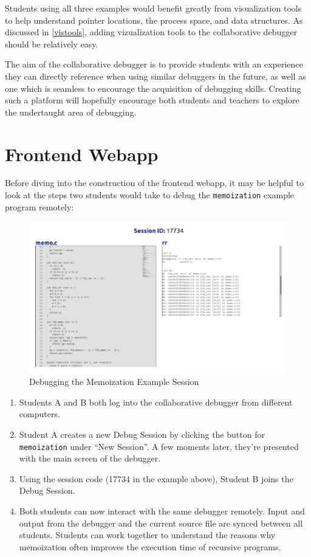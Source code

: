 \documentclass[12pt]{article}
\begin{document}
Students using all three examples would benefit greatly from
visualization tools to help understand pointer locations, the process
space, and data structures.  As discussed in \ref{vistools}, adding
vizualization tools to the collaborative debugger should be relatively
easy.
\par 

The aim of the collaborative debugger is to provide students with an
experience they can directly reference when using similar debuggers in
the future, as well as one which is seamless to encourage the
acquisition of debugging skills.  Creating such a platform will
hopefully encourage both students and teachers to explore the
undertaught area of debugging.

\section{Frontend Webapp}\label{webapp}

Before diving into the construction of the frontend webapp, it may be
helpful to look at the steps two students would take to debug the
\lstinline{memoization} example program remotely:

\begin{figure}[h!]

  \includegraphics[width=\textwidth]{memoization}
  \centering
  \caption{Debugging the Memoization Example Session}
  \label{frontend:rrterm}
\end{figure}

\begin{enumerate}
\item Students A and B both log into the collaborative debugger from
  different computers.
\item Student A creates a new Debug Session by clicking the button for
  \lstinline{memoization} under ``New Session''.  A few moments later,
  they're presented with the main screen of the debugger.
\item Using the session code (17734 in the example above), Student B
  joins the Debug Session.
\item Both students can now interact with the same debugger remotely.
  Input and output from the debugger and the current source file are
  synced between all students.  Students can work together to
  understand the reasons why memoization often improves the execution
  time of recursive programs.
\end{enumerate}
\end{document}
